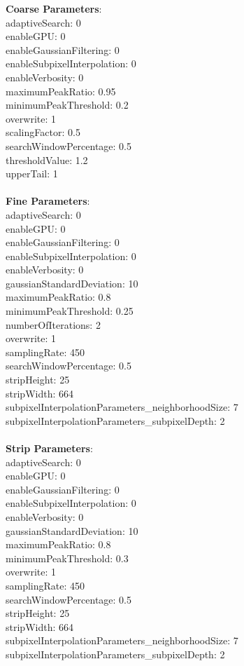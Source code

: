 \documentclass[11pt]{article}
\begin{document}
\textbf{Coarse Parameters}: \\
adaptiveSearch: 0\\
enableGPU: 0\\
enableGaussianFiltering: 0\\
enableSubpixelInterpolation: 0\\
enableVerbosity: 0\\
maximumPeakRatio: 0.95\\
minimumPeakThreshold: 0.2\\
overwrite: 1\\
scalingFactor: 0.5\\
searchWindowPercentage: 0.5\\
thresholdValue: 1.2\\
upperTail: 1\\
\\
\textbf{Fine Parameters}: \\
adaptiveSearch: 0\\
enableGPU: 0\\
enableGaussianFiltering: 0\\
enableSubpixelInterpolation: 0\\
enableVerbosity: 0\\
gaussianStandardDeviation: 10\\
maximumPeakRatio: 0.8\\
minimumPeakThreshold: 0.25\\
numberOfIterations: 2\\
overwrite: 1\\
samplingRate: 450\\
searchWindowPercentage: 0.5\\
stripHeight: 25\\
stripWidth: 664\\
subpixelInterpolationParameters\_neighborhoodSize: 7\\
subpixelInterpolationParameters\_subpixelDepth: 2\\
\\
\textbf{Strip Parameters}: \\
adaptiveSearch: 0\\
enableGPU: 0\\
enableGaussianFiltering: 0\\
enableSubpixelInterpolation: 0\\
enableVerbosity: 0\\
gaussianStandardDeviation: 10\\
maximumPeakRatio: 0.8\\
minimumPeakThreshold: 0.3\\
overwrite: 1\\
samplingRate: 450\\
searchWindowPercentage: 0.5\\
stripHeight: 25\\
stripWidth: 664\\
subpixelInterpolationParameters\_neighborhoodSize: 7\\
subpixelInterpolationParameters\_subpixelDepth: 2\\
\\
\newpage
\end{document}
